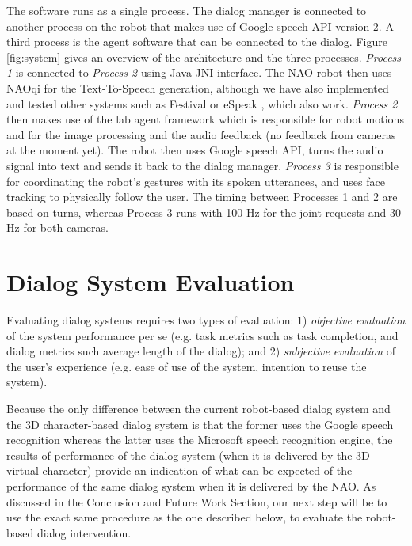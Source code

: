 \documentclass[letterpaper]{article}
\begin{document}
The software runs as a single process. The
dialog manager is connected to another process on the robot that makes use of Google speech API 
version 2. 
A third process is 
the agent software that can be connected to the dialog. Figure \ref{fig:system} gives an 
overview of the architecture and the three processes. {\em Process 1} is connected to {\em Process 2} using 
Java JNI interface.  The NAO robot then uses NAOqi for the Text-To-Speech 
generation, although we have also implemented and tested other systems such as Festival 
\cite{taylor1998architecture} or eSpeak \cite{eSpeak}, which  also work. {\em Process 2} then makes 
use of the lab agent framework which is responsible for robot motions and 
for the image processing and the audio feedback (no feedback from cameras at the moment yet). The 
robot then uses Google speech API, turns the audio signal into text and sends it back to the dialog 
manager. {\em Process 3} is responsible for coordinating the robot's gestures with its spoken utterances, and uses face tracking to physically follow the user.  The timing between Processes 1 and 2 are based on turns, whereas Process 3 runs with 100 Hz for the 
joint requests and 30 Hz for both cameras.

\section*{Dialog System Evaluation}

Evaluating dialog systems requires two types of evaluation: 1) {\em objective evaluation} of the system performance per se (e.g. task metrics such as task completion, and dialog metrics such average length of the dialog); and 2) {\em subjective evaluation} of the user's experience (e.g. ease of use of the system, intention to reuse the system).

Because the only difference between the current robot-based dialog system and the 3D character-based dialog system \cite{YASCLL14} is that the former uses the Google speech recognition whereas the latter uses the Microsoft speech recognition engine, the results of performance of the dialog system (when it is delivered by the 3D virtual character) provide an indication of what can be expected of the performance of the same dialog system when it is delivered by the NAO.  As discussed in the Conclusion and Future Work Section, our next step will be to use the exact same procedure as the one described below, to evaluate the robot-based dialog intervention.
\end{document}
